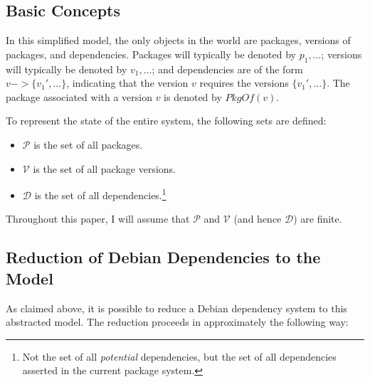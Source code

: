 \documentclass[letterpaper]{article}
\theoremstyle{definition}
\theoremstyle{remark}
\renewcommand{\P}{\mathcal{P}}
\newcommand{\V}{\mathcal{V}}
\newcommand{\D}{\mathcal{D}}
\newcommand{\pkgof}[1]{PkgOf(#1)}
\begin{document}
\subsection{Basic Concepts}

In this simplified model, the only objects in the world are packages,
versions of packages, and dependencies.  Packages will typically be
denoted by $p_1, \dots$; versions will typically be denoted by $v_1,
\dots$; and dependencies are of the form $v -> \{v_1', \dots\}$,
indicating that the version $v$ requires the versions $\{v_1',
\dots\}$.  The package associated with a version $v$ is denoted by
$\pkgof{v}$.

To represent the state of the entire system, the following sets are
defined:

\begin{itemize}
\item $\P$ is the set of all packages.
\item $\V$ is the set of all package versions.
\item $\D$ is the set of all dependencies.\footnote{Not the set of all
    \emph{potential} dependencies, but the set of all dependencies
    asserted in the current package system.}
\end{itemize}

Throughout this paper, I will assume that $\P$ and $\V$ (and hence
$\D$) are finite.

\subsection{Reduction of Debian Dependencies to the Model}

As claimed above, it is possible to reduce a Debian dependency system
to this abstracted model.  The reduction proceeds in approximately the
following way:
\end{document}

